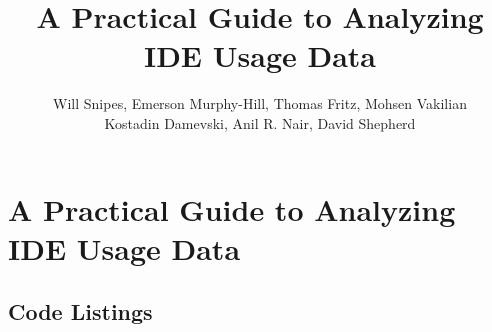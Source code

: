 \documentclass{book}
\begin{document}
\title{A Practical Guide to Analyzing IDE Usage Data\vspace{-0ex}}

\chapter{A Practical Guide to Analyzing IDE Usage Data\vspace{-0ex}}
\author{
Will Snipes, Emerson Murphy-Hill,
Thomas Fritz, Mohsen Vakilian \\
Kostadin Damevski,
Anil R. Nair, David Shepherd
}
\maketitle
\thispagestyle{empty}
\pagestyle{empty}



\pagebreak





\section{Code Listings}



 
\end{document}
